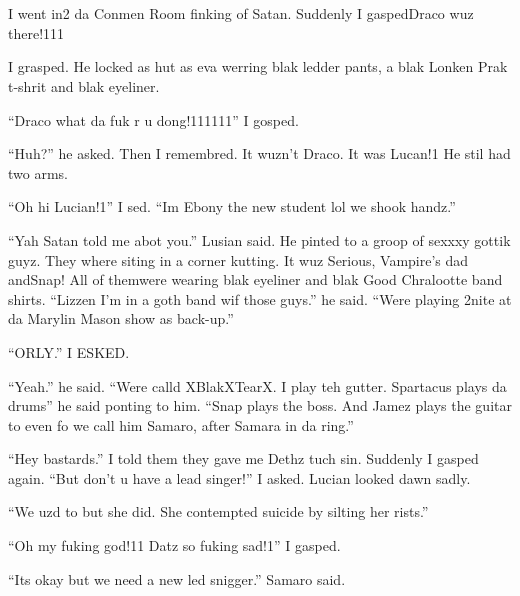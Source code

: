 \section[gost of u]{\protect{}}


\XXX{\Xfill 666\Xfill}

I went in2 da Conmen Room finking of Satan. Suddenly I gasped\dotfill Draco wuz there!111

I grasped. He locked as hut as eva werring blak ledder pants, a blak Lonken Prak t-shrit and blak eyeliner.

\enquote{Draco what da fuk r u dong!111111} I gosped.

\enquote{Huh?} he asked. Then I remembred. It wuzn't Draco. It was Lucan!1 He stil had two arms.

\enquote{Oh hi Lucian!1} I sed. \enquote{Im Ebony the new student lol we shook handz.}

\enquote{Yah Satan told me abot you.} Lusian said. He pinted to a groop of sexxxy gottik guyz. They where siting in a corner kutting. It wuz Serious, Vampire's dad and\dotfill Snap! All of them\newline were wearing blak eyeliner and blak Good Chralootte band shirts. \enquote{Lizzen I'm in a goth band wif those guys.} he said. \enquote{Were playing 2nite at da Marylin Mason show as back-up.}

\enquote{ORLY.} I ESKED\@.

\enquote{Yeah.} he said. \enquote{Were calld XBlakXTearX. I play teh gutter. Spartacus plays da drums} he said ponting to him. \enquote{Snap plays the boss. And Jamez plays the guitar to even fo we call him Samaro, after Samara in da ring.}

\enquote{Hey bastards.} I told them they gave me Dethz tuch sin. Suddenly I gasped again. \enquote{But don't u have a lead singer!} I asked. Lucian looked dawn sadly.

\enquote{We uzd to but she did. She contempted suicide by silting her rists.}

\enquote{Oh my fuking god!11 Datz so fuking sad!1} I gasped.

\enquote{Its okay but we need a new led snigger.} Samaro said.

